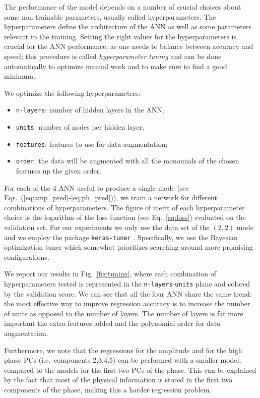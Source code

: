 \documentclass[twocolumn,showpacs,preprintnumbers,nofootinbib,prd,
superscriptaddress,10pt]{revtex4-2}
\begin{document}
The performance of the model depends on a number of crucial choices about some non-trainable parameters, usually called 
hyperparameters. The hyperparameters define the architecture of the ANN as well as some parameters relevant to the training.
Setting the right values for the hyperparameters is crucial for the ANN performance, as one needs to balance 
between accuracy and speed; this procedure is called {\it hyperparameter tuning} and can be done automatically to 
optimize manual work and to make sure to find a good minimum.

We optimize the following hyperparameters:
\begin{itemize}
	\item \texttt{n-layers}: number of hidden layers in the ANN;
	\item \texttt{units}: number of nodes per hidden layer;
	\item \texttt{features}: features to use for data augmentation;
	\item \texttt{order}: the data will be augmented with all the monomials of the chosen features up the given order.
\end{itemize}

For each of the 4 ANN useful to produce a single mode (see Eqs.~(\ref{eq:amp_pred}-\ref{eq:ph_pred})), we train a network for different combinations of hyperparameters. The figure of merit of each 
hyperparameter choice is the logarithm of the loss function (see Eq.~\eqref{eq:loss}) evaluated on the validation set.
For our experiments we only use the data set of the $(2,2)$ mode and we employ the package \texttt{keras-tuner} \cite{omalley2019kerastuner}. Specifically, we use the Bayesian optimization tuner which somewhat prioritizes searching around more promising configurations.

We report our results in Fig.~\ref{fig:tuning}, where each combination of hyperparameters tested is represented in the \texttt{n-layers}-\texttt{units} plane and colored by the validation score. 
We can see that all the four ANN share the same trend: the most effective way to improve regression accuracy is to increase the number of units as opposed to the number of layers.
The number of layers is far more important the extra features added and the polynomial order for data augmentation.

Furthermore, we note that the regressions for the amplitude and for the high phase PCs 
(i.e.~components 2,3,4,5) can be performed with a smaller model, compared to the models for the first two PCs of the phase. 
This can be explained by the fact that most of the physical information is stored in the first two components of the phase, making this a harder regression problem.
\end{document}
